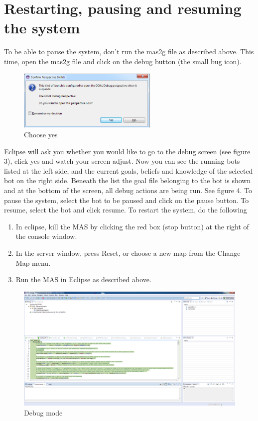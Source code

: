 \documentclass[11pt,a4paper]{article}
\begin{document}
\section{Restarting, pausing and resuming the system}
To be able to pause the system, don’t run the mas2g file as described above.
This time, open the mas2g file and click on the debug button (the small bug icon).
\begin{figure}
  \begin{center}
    \includegraphics[width=0.6\textwidth]{debug.png}
  \end{center}
  \caption{Choose yes}
\end{figure}
Eclipse will ask you whether you would like to go to the debug screen (see figure 3), click yes and watch your screen adjust.
Now you can see the running bots listed at the left side, and the current goals, beliefs and knowledge of the selected bot on the right side. Beneath the list the goal file belonging to the bot is shown and at the bottom of the screen, all debug actions are being run. See figure 4.
To pause the system, select the bot to be paused and click on the pause button. To resume, select the bot and click resume.
To restart the system, do the following
\begin{enumerate}
\item In eclipse, kill the MAS by clicking the red box (stop button) at the right of the console window.
\item In the server window, press Reset, or choose a new map from the Change Map menu.
\item Run the MAS in Eclipse as described above.
\end{enumerate}
\begin{figure}
    \includegraphics[width=\textwidth]{debugmode.png}
    \caption{Debug mode}
\end{figure}
\end{document}
